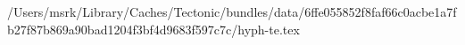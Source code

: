 /Users/msrk/Library/Caches/Tectonic/bundles/data/6ffe055852f8faf66c0acbe1a7fb27f87b869a90bad1204f3bf4d9683f597c7c/hyph-te.tex